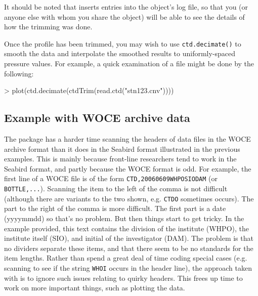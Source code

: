 \documentclass{article}
\begin{document}
It should be noted that \verb@ctdTrim@ inserts entries into the object's log
file, so that you (or anyone else with whom you share the object) will be able to
see the details of how the trimming was done.


Once the profile has been trimmed, you may wish to use \texttt{ctd.decimate()}
to smooth the data and interpolate the smoothed results to uniformly-spaced
pressure values. For example, a quick examination of a file might be done by the
following:
\begin{Schunk}
\begin{Sinput}
> plot(ctd.decimate(ctdTrim(read.ctd("stn123.cnv"))))
\end{Sinput}
\end{Schunk}

\subsection{Example with WOCE archive data}

The package has a harder time scanning the headers of data files in the WOCE
archive format than it does in the Seabird format illustrated in the previous
examples. This is mainly because front-line researchers tend to work in the
Seabird format, and partly because the WOCE format is odd. For example, the
first line of a WOCE file is of the form \texttt{CTD,20060609WHPOSIODAM} (or
\texttt{BOTTLE,...}).  Scanning the item to the left of the comma is not
difficult (although there are variants to the two shown, e.g. \texttt{CTDO}
sometimes occurs).  The part to the right of the comma is more difficult.  The
first part is a date (yyyymmdd) so that's no problem.  But then things start to
get tricky.  In the example provided, this text contains the division of the
institute (WHPO), the institute itself (SIO), and initial of the investigator
(DAM). The problem is that no dividers separate these items, and that there seem
to be no standards for the item lengths. Rather than spend a great deal of time
coding special cases (e.g. scanning to see if the string \texttt{WHOI} occurs in
the header line), the approach taken with \verb@oce@ is to ignore such issues
relating to quirky headers.  This frees up time to work on more important
things, such as plotting the data.
\end{document}

